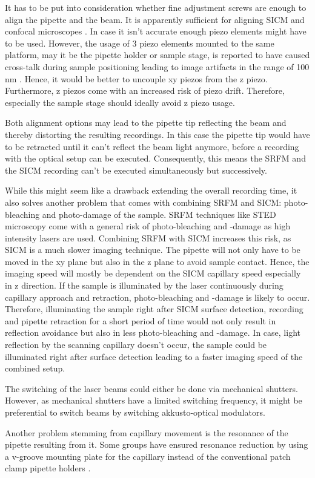It has to be put into consideration whether fine adjustment screws are enough
to align the pipette and the beam. It is apparently sufficient for aligning
SICM and confocal microscopes \cite{Gorelik2002a}\cite{Shevchuk2008}. 
In case it isn't accurate enough piezo elements might have to be used. 
However, the usage of 3 piezo elements mounted to the same platform, may it be
the pipette holder or sample stage, is reported to have caused cross-talk during
sample positioning leading to image artifacts in the range of 100 nm 
\cite{Shevchuk2013}. Hence, it would be better to uncouple xy piezos from 
the z piezo. Furthermore, z piezos come with an increased risk of piezo drift. 
Therefore, especially the sample stage should ideally avoid z piezo usage.

Both alignment options may lead to the pipette tip reflecting the beam and
thereby distorting the resulting recordings. In this case the pipette tip
would have to be retracted until it can't reflect the beam light anymore,
before a recording with the optical setup can be executed. Consequently, this
means the SRFM and the SICM recording can't be executed simultaneously but
successively.

While this might seem like a drawback extending the overall recording time, it
also solves another problem that comes with combining SRFM and SICM:
photo-bleaching and photo-damage of the sample. SRFM techniques like STED
microscopy come with a general risk of photo-bleaching and -damage as high
intensity lasers are used. Combining SRFM with SICM increases this risk,
as SICM is a much slower imaging technique. The pipette will not only have to
be moved in the xy plane but also in the z plane to avoid sample
contact. Hence, the imaging speed will mostly be dependent on the SICM
capillary speed especially in z direction. If the sample is illuminated by the
laser continuously during capillary approach and retraction, photo-bleaching
and -damage is likely to occur. Therefore, illuminating the sample right after
SICM surface detection, recording and pipette retraction for a short period of
time would not only result in reflection avoidance but also in less
photo-bleaching and -damage. In case, light reflection by the scanning
capillary doesn't occur, the sample could be illuminated right after surface
detection leading to a faster imaging speed of the combined setup.

The switching of the laser beams could either be done via mechanical
shutters. However, as mechanical shutters have a limited switching frequency,
it might be preferential to switch beams by switching akkusto-optical modulators.

Another problem stemming from capillary movement is the resonance of the
pipette resulting from it. Some groups have ensured resonance reduction by
using a v-groove mounting plate for the capillary instead of the conventional
patch clamp pipette holders \cite{Shevchuk2013}.

 	

